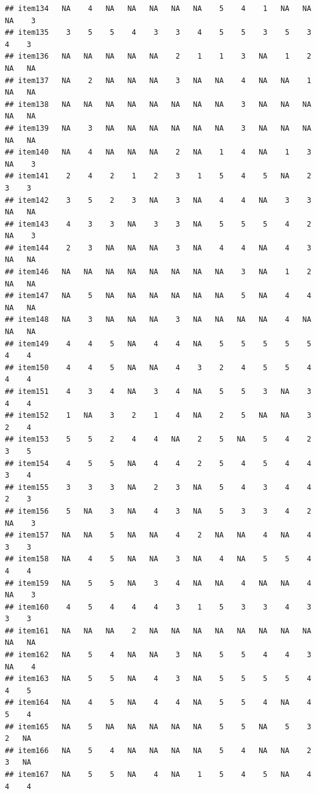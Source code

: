 \documentclass[
  man]{apa6}
\begin{document}
\begin{verbatim}
## item134   NA    4   NA   NA   NA   NA   NA    5    4    1   NA   NA   NA    3
## item135    3    5    5    4    3    3    4    5    5    3    5    3    4    3
## item136   NA   NA   NA   NA   NA    2    1    1    3   NA    1    2   NA   NA
## item137   NA    2   NA   NA   NA    3   NA   NA    4   NA   NA    1   NA   NA
## item138   NA   NA   NA   NA   NA   NA   NA   NA    3   NA   NA   NA   NA   NA
## item139   NA    3   NA   NA   NA   NA   NA   NA    3   NA   NA   NA   NA   NA
## item140   NA    4   NA   NA   NA    2   NA    1    4   NA    1    3   NA    3
## item141    2    4    2    1    2    3    1    5    4    5   NA    2    3    3
## item142    3    5    2    3   NA    3   NA    4    4   NA    3    3   NA   NA
## item143    4    3    3   NA    3    3   NA    5    5    5    4    2   NA    3
## item144    2    3   NA   NA   NA    3   NA    4    4   NA    4    3   NA   NA
## item146   NA   NA   NA   NA   NA   NA   NA   NA    3   NA    1    2   NA   NA
## item147   NA    5   NA   NA   NA   NA   NA   NA    5   NA    4    4   NA   NA
## item148   NA    3   NA   NA   NA    3   NA   NA   NA   NA    4   NA   NA   NA
## item149    4    4    5   NA    4    4   NA    5    5    5    5    5    4    4
## item150    4    4    5   NA   NA    4    3    2    4    5    5    4    4    4
## item151    4    3    4   NA    3    4   NA    5    5    3   NA    3    4    4
## item152    1   NA    3    2    1    4   NA    2    5   NA   NA    3    2    4
## item153    5    5    2    4    4   NA    2    5   NA    5    4    2    3    5
## item154    4    5    5   NA    4    4    2    5    4    5    4    4    3    4
## item155    3    3    3   NA    2    3   NA    5    4    3    4    4    2    3
## item156    5   NA    3   NA    4    3   NA    5    3    3    4    2   NA    3
## item157   NA   NA    5   NA   NA    4    2   NA   NA    4   NA    4    3    3
## item158   NA    4    5   NA   NA    3   NA    4   NA    5    5    4    4    4
## item159   NA    5    5   NA    3    4   NA   NA    4   NA   NA    4   NA    3
## item160    4    5    4    4    4    3    1    5    3    3    4    3    3    3
## item161   NA   NA   NA    2   NA   NA   NA   NA   NA   NA   NA   NA   NA   NA
## item162   NA    5    4   NA   NA    3   NA    5    5    4    4    3   NA    4
## item163   NA    5    5   NA    4    3   NA    5    5    5    5    4    4    5
## item164   NA    4    5   NA    4    4   NA    5    5    4   NA    4    5    4
## item165   NA    5   NA   NA   NA   NA   NA    5    5   NA    5    3    2   NA
## item166   NA    5    4   NA   NA   NA   NA    5    4   NA   NA    2    3   NA
## item167   NA    5    5   NA    4   NA    1    5    4    5   NA    4    4    4

\end{verbatim}
\end{document}
